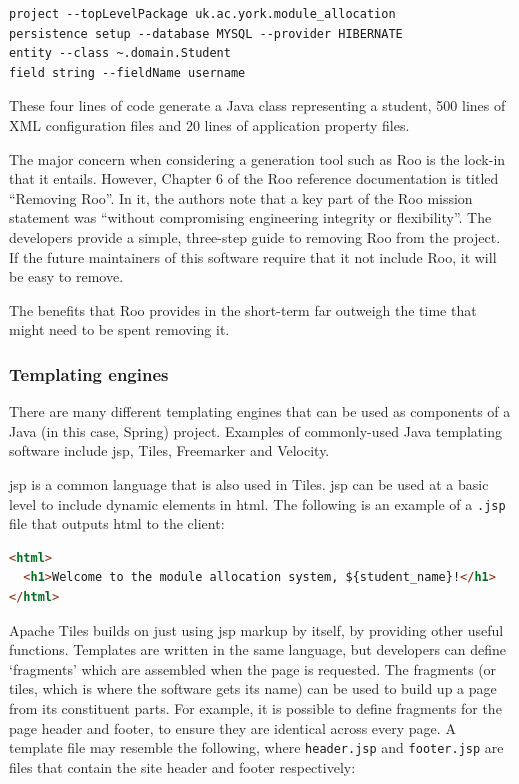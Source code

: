 \documentclass[]{scrartcl}
\begin{document}
\begin{lstlisting}
project --topLevelPackage uk.ac.york.module_allocation
persistence setup --database MYSQL --provider HIBERNATE
entity --class ~.domain.Student
field string --fieldName username
\end{lstlisting}

These four lines of code generate a Java class representing a student, 500
lines of XML configuration files and 20 lines of application property files.

The major concern when considering a generation tool such as Roo is the
lock-in that it entails. However, Chapter 6 of the Roo reference documentation
\cite{RooReferenceDocs2011} is titled ``Removing Roo''. In it, the authors
note that a key part of the Roo mission statement was ``without compromising
engineering integrity or flexibility''. The developers provide a simple,
three-step guide to removing Roo from the project. If the future maintainers
of this software require that it not include Roo, it will be easy to remove.

The benefits that Roo provides in the short-term far outweigh the time that
might need to be spent removing it.

\subsubsection{Templating engines}


There are many different templating engines that can be used as components of
a Java (in this case, Spring) project. Examples of commonly-used Java
templating software include \gls{jsp}, Tiles, Freemarker and Velocity.


\gls{jsp} is a common language that is also used in Tiles. \gls{jsp} can be
used at a basic level to include dynamic elements in \gls{html}. The following
is an example of a \texttt{.jsp} file that outputs \gls{html} to the client:

\begin{lstlisting}[language=HTML]
<html>
  <h1>Welcome to the module allocation system, ${student_name}!</h1>
</html>
\end{lstlisting}


Apache Tiles builds on just using \gls{jsp} markup by itself, by providing
other useful functions. Templates are written in the same language, but
developers can define `fragments' which are assembled when the page is
requested. The fragments (or tiles, which is where the software gets its name)
can be used to build up a page from its constituent parts. For example, it is
possible to define fragments for the page header and footer, to ensure they
are identical across every page. A template file may resemble the following,
where \texttt{header.jsp} and \texttt{footer.jsp} are files that contain the
site header and footer respectively:
\end{document}

